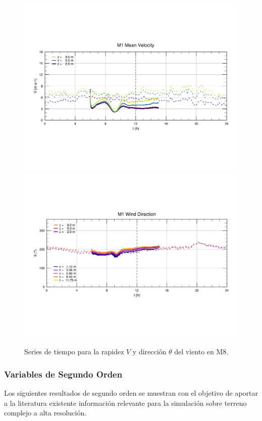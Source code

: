 \begin{figure}[H]
	\centering
	\includegraphics[width=0.87\linewidth,page=8,trim={9mm 57mm 10mm 60mm},clip]{Imagenes/06/bol/ts_interpol_compare.pdf}\\%
	\includegraphics[width=0.87\linewidth,page=8,trim={12mm 52mm 10mm 60mm},clip]{Imagenes/06/bol/ts_interpol_compare_o.pdf}%
	\vspace{-2mm}\caption{Series de tiempo para la rapidez $V$ y dirección $\theta$ del viento en M8.}
	\label{fig:06_bol_ts_m8}
\end{figure}
\vspace*{\fill}
\newpage
\subsubsection{Variables de Segundo Orden}
Los siguientes resultados de segundo orden se muestran con el objetivo de aportar a la literatura existente información relevante para la simulación sobre terreno complejo a alta resolución.


